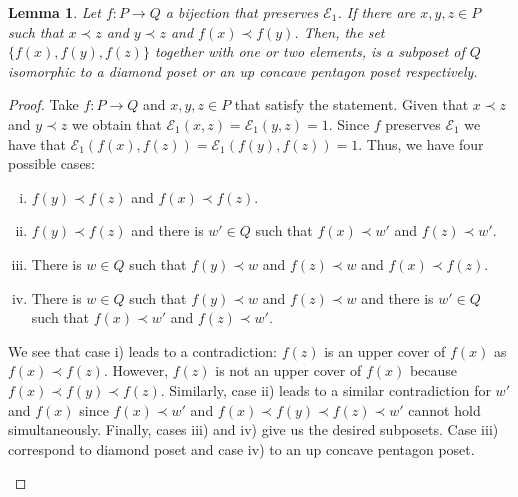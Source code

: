 \documentclass{article}[12pt]
\theoremstyle{exampstyle}
\newtheorem{lemma}[theorem]{Lemma}
\theoremstyle{remark}
\newcommand{\E}{\mathcal{E}}
\begin{document}
\begin{lemma}
    Let $f: P \to Q$ a bijection that preserves $\E_1$. If there are $x,y,z \in P$ such that $x \prec z$ and $y \prec z$ and $f(x) \prec f(y)$. Then, the set $\{f(x), f(y), f(z)\}$ together with one or two elements, is a subposet of $Q$ isomorphic to a diamond poset or an up concave pentagon poset respectively.
    \label{lemma:diamond_pentagon_shape}
\end{lemma}
\begin{proof}
    Take $f: P \to Q$ and $x,y,z \in P$ that satisfy the statement. Given that  $x \prec z$ and $y \prec z$ we obtain that $\E_1(x,z) = \E_1(y,z) = 1$. Since $f$ preserves $\E_1$  we have that $\E_1(f(x),f(z)) = \E_1(f(y),f(z)) = 1$. Thus, we have four possible cases:

    \begin{enumerate}[i) ]
        \item $f(y) \prec f(z)$ and $f(x) \prec f(z)$.
        \item $f(y) \prec f(z)$ and there is $w' \in Q$ such that $f(x) \prec w'$ and $f(z) \prec w'$.
        \item There is $w \in Q$ such that $f(y) \prec w$ and $f(z) \prec w$ and $f(x) \prec f(z)$.
        \item  There is $w \in Q$ such that $f(y) \prec w$ and $f(z) \prec w$ and there is $w' \in Q$ such that $f(x) \prec w'$ and $f(z) \prec w'$.
    \end{enumerate}

We see that case i) leads to a contradiction: $f(z)$ is an upper cover of $f(x)$ as $f(x) \prec f(z)$. However, $f(z)$ is not an upper cover of $f(x)$  because $f(x) \prec f(y) \prec f(z)$. Similarly, case ii) leads to a similar contradiction for $w'$ and $f(x)$ since $f(x) \prec w'$ and $f(x) \prec f(y) \prec f(z) \prec w'$ cannot hold simultaneously. Finally, cases iii) and iv) give us the desired subposets. Case iii) correspond to diamond poset and case iv) to an up concave pentagon poset.
\begin{center}
\end{center}
\end{proof}
\end{document}
